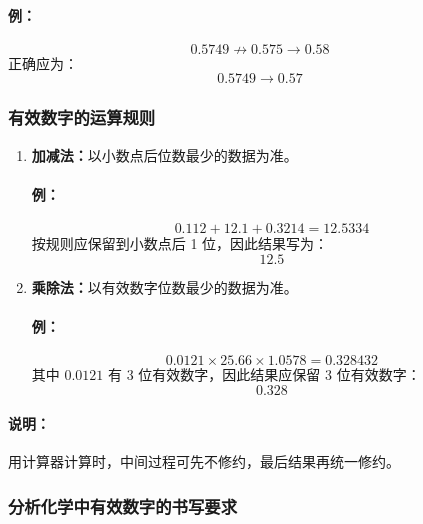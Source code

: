 \documentclass[12pt,a4paper]{article}
\numberwithin{equation}{section}
\begin{document}
\paragraph{例：}
\begin{equation}
0.5749 \not\rightarrow 0.575 \rightarrow 0.58
\end{equation}
正确应为：
\begin{equation}
0.5749 \rightarrow 0.57
\end{equation}

\subsubsection{有效数字的运算规则}

\begin{enumerate}
    \item \textbf{加减法：}以小数点后位数最少的数据为准。
    
    \paragraph{例：}
\begin{equation}
    0.112+12.1+0.3214=12.5334
\end{equation}
    按规则应保留到小数点后 1 位，因此结果写为：
\begin{equation}
    12.5
\end{equation}
    
    \item \textbf{乘除法：}以有效数字位数最少的数据为准。
    
    \paragraph{例：}
\begin{equation}
    0.0121\times 25.66\times 1.0578=0.328432
\end{equation}
    其中 $0.0121$ 有 3 位有效数字，因此结果应保留 3 位有效数字：
\begin{equation}
    0.328
\end{equation}
\end{enumerate}

\paragraph{说明：}
用计算器计算时，中间过程可先不修约，最后结果再统一修约。

\subsubsection{分析化学中有效数字的书写要求}
\end{document}
